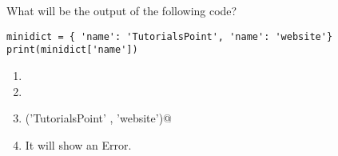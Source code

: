 \question
What will be the output of the following code?

\begin{lstlisting}
minidict = { 'name': 'TutorialsPoint', 'name': 'website'}
print(minidict['name'])
\end{lstlisting}

\begin{enumerate}
\item \lstinline@TutorialsPoint@
\item \lstinline@Website@
\item \lstinline@('TutorialsPoint' , 'website')@
\item It will show an Error.
\end{enumerate}

